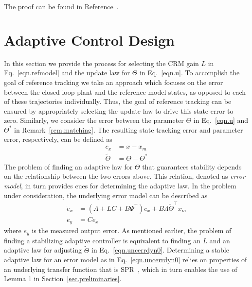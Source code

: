 \documentclass[]{../sty/JGCD}
\theoremstyle{examplestyle}
\begin{document}
  \begin{proof-dan}
    The proof can be found in Reference\ \cite{boyd.lmibook.1994}.
  \end{proof-dan}

  \section{Adaptive Control Design}\label{sec.adaptivecontroldesign}

  In this section we provide the process for selecting the CRM gain $L$ in Eq.\ \eqref{eqn.refmodel} and the update law for $\Theta$ in Eq.\ \eqref{eqn.u}.
  To accomplish the goal of reference tracking we take an approach which focuses on the error between the closed-loop plant and the reference model states, as opposed to each of these trajectories individually.
  Thus, the goal of reference tracking can be ensured by appropriately selecting the update law to drive this state error to zero.
  Similarly, we consider the error between the parameter $\Theta$ in Eq.\ \eqref{eqn.u} and $\Theta^{*}$ in Remark~\ref{rem.matching}.
  The resulting state tracking error and parameter error, respectively, can be defined as
  \begin{align*}
    e_{x}&=x-x_{m} \\
    \widetilde{\Theta}&=\Theta-\Theta^{*}
  \end{align*}
  The problem of finding an adaptive law for $\Theta$ that guarantees stability depends on the relationship between the two errors above.
  This relation, denoted as \textit{error model}, in turn provides cues for determining the adaptive law.
  In the problem under consideration, the underlying error model can be described as
  \begin{equation}
    \label{eqn.uncerrdyn0}
    \begin{split}
      \dot{e}_{x}&=(A+LC+B\Psi^{\top})e_{x}+B\Lambda\widetilde{\Theta}^{\top}x_{m} \\
      e_{y}&=Ce_{x}
    \end{split}
  \end{equation}
  where $e_{y}$ is the measured output error.
  As mentioned earlier, the problem of finding a stabilizing adaptive controller is equivalent to finding an $L$ and an adaptive law for adjusting $\widetilde{\Theta}$ in Eq.\ \eqref{eqn.uncerrdyn0}.
  Determining a stable adaptive law for an error model as in Eq.\ \eqref{eqn.uncerrdyn0} relies on properties of an underlying transfer function that is SPR\ \cite{narendra.stable.2005}, which in turn enables the use of  Lemma 1 in Section~\ref{sec.preliminaries}.
\end{document}
